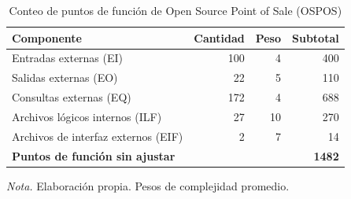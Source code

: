 \begin{table}[H]
\caption{Conteo de puntos de función de Open Source Point of Sale (OSPOS)}
\label{tab:ref3_pf}
\begin{threeparttable}
\begin{tabular}{>{\raggedright\arraybackslash}p{6cm} rrr}
\toprule
Componente & Cantidad & Peso & Subtotal \\
\midrule
Entradas externas (EI) & 100 & 4 & 400 \\
Salidas externas (EO) & 22 & 5 & 110 \\
Consultas externas (EQ) & 172 & 4 & 688 \\
Archivos lógicos internos (ILF) & 27 & 10 & 270 \\
Archivos de interfaz externos (EIF) & 2 & 7 & 14 \\
\textbf{Puntos de función sin ajustar} &  &  & \textbf{1482} \\
\bottomrule
\end{tabular}
\begin{tablenotes}
\item \textit{Nota.} Elaboración propia. Pesos de complejidad promedio.
\end{tablenotes}
\end{threeparttable}
\end{table}

